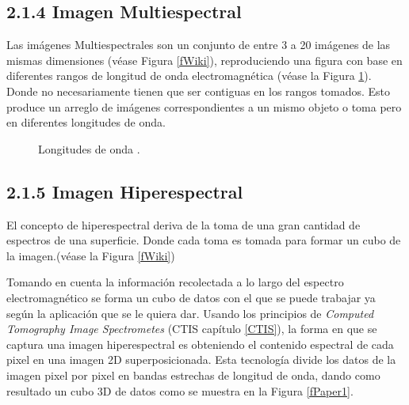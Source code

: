 \subsection{2.1.4 Imagen Multiespectral}
Las imágenes Multiespectrales son un conjunto de entre 3 a 20 imágenes de las mismas dimensiones (véase Figura \ref{fWiki}), reproduciendo una figura con base en diferentes rangos de longitud de onda electromagnética (véase la Figura \ref{fJairo}). Donde no necesariamente tienen que ser contiguas en los rangos tomados. Esto produce un arreglo de imágenes correspondientes a un mismo objeto o toma pero en diferentes longitudes de onda.

\begin{figure}[h]
  \centering
  \centering
  \caption{Longitudes de onda \cite{FuzzyVD}.}
  \label{fJairo}
\end{figure}

\subsection{2.1.5 Imagen Hiperespectral}
El concepto de hiperespectral deriva de la toma de una gran cantidad de espectros de una superficie. Donde cada toma es tomada para formar un cubo de la imagen.(véase la Figura \ref{fWiki})

Tomando en cuenta la información recolectada a lo largo del espectro electromagnético se forma un cubo de datos con el que se puede trabajar ya según la aplicación que se le quiera dar. Usando los principios de \emph{Computed Tomography Image Spectrometes} (CTIS capítulo \ref{CTIS}), la forma en que se captura una imagen hiperespectral es obteniendo el contenido espectral de cada pixel en una imagen 2D superposicionada. Esta tecnología divide los datos de la imagen pixel por pixel en bandas estrechas de longitud de onda, dando como resultado un cubo 3D de datos como se muestra en la Figura \ref{fPaper1}.\\

